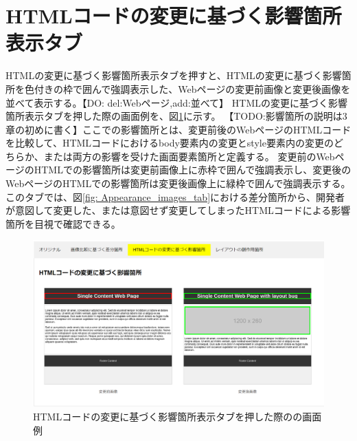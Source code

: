 \section{HTMLコードの変更に基づく影響箇所表示タブ}\label{sec:html_tab}
HTMLの変更に基づく影響箇所表示タブを押すと、HTMLの変更に基づく影響箇所を色付きの枠で囲んで強調表示した、Webページの変更前画像と変更後画像を並べて表示する。【DO: del:Webページ,add:並べて】
HTMLの変更に基づく影響箇所表示タブを押した際の画面例を、図\ref{fig: Appearance_html_tab}に示す。
【TODO:影響箇所の説明は3章の初めに書く】ここでの影響箇所とは、変更前後のWebページのHTMLコードを比較して、HTMLコードにおけるbody要素内の変更とstyle要素内の変更のどちらか、または両方の影響を受けた画面要素箇所と定義する。
変更前のWebページのHTMLでの影響箇所は変更前画像上に赤枠で囲んで強調表示し、変更後のWebページのHTMLでの影響箇所は変更後画像上に緑枠で囲んで強調表示する。
このタブでは、図\ref{fig: Appearance_images_tab}における差分箇所から、開発者が意図して変更した、または意図せず変更してしまったHTMLコードによる影響箇所を目視で確認できる。
\begin{figure}[tp]
    \begin{center}
        \includegraphics[width=1.0\columnwidth]{image/3_html_tab.png}
        \caption{HTMLコードの変更に基づく影響箇所表示タブを押した際の\toolName の画面例}
        \label{fig: Appearance_html_tab}
    \end{center}
\end{figure}



